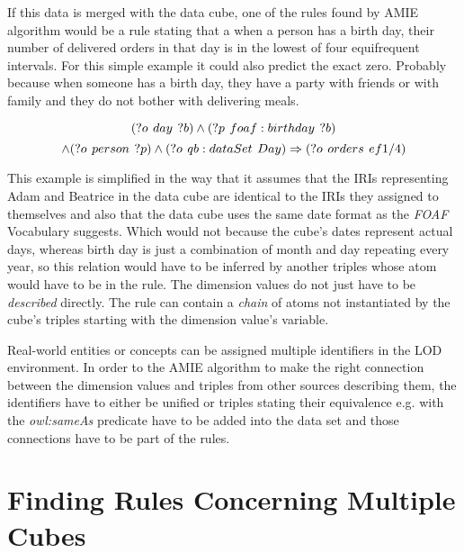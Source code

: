If this data is merged with the data cube, one of the rules found by AMIE algorithm would be a rule stating that a when a person has a birth day, their number of delivered orders in that day is in the lowest of four equifrequent intervals. For this simple example it could also predict the exact zero. Probably because when someone has a birth day, they have a party with friends or with family and they do not bother with delivering meals.

$$
(?o\hspace{0.4em}day\hspace{0.4em}?b) \land (?p\hspace{0.4em}foaf:birthday\hspace{0.4em}?b)
$$
$$ 
\land (?o\hspace{0.4em}person\hspace{0.4em}?p) \land (?o\hspace{0.4em}qb:dataSet\hspace{0.4em}Day)  \Rightarrow (?o\hspace{0.4em}orders\hspace{0.4em}ef1/4) 
$$

This example is simplified in the way that it assumes that the IRIs representing Adam and Beatrice in the data cube are identical to the IRIs they assigned to themselves and also that the data cube uses the same date format as the \textit{FOAF} Vocabulary suggests. Which would not because the cube's dates represent actual days, whereas birth day is just a combination of month and day repeating every year, so this relation would have to be inferred by another triples whose atom would have to be in the rule. The dimension values do not just have to be \textit{described} directly. The rule can contain a \textit{chain} of atoms not instantiated by the cube's triples starting with the dimension value's variable.

Real-world entities or concepts can be assigned multiple identifiers in the LOD environment. In order to the AMIE algorithm to make the right connection between the dimension values and triples from other sources describing them, the identifiers have to either be unified or triples stating their equivalence e.g. with the \textit{owl:sameAs} predicate have to be added into the data set and those connections have to be part of the rules.

\section{Finding Rules Concerning Multiple Cubes}

